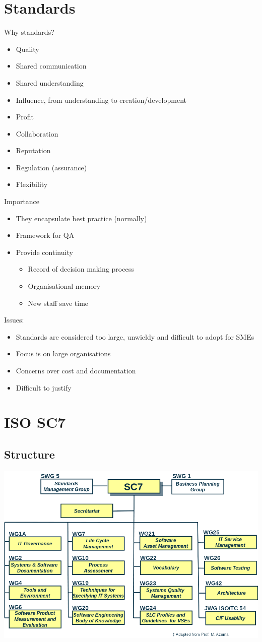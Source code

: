 \documentclass{article}[18pt]
\begin{document}
\section{Standards}
Why standards?
\begin{itemize}
	\item Quality
	\item Shared communication
	\item Shared understanding
	\item Influence, from understanding to creation/development
	\item Profit
	\item Collaboration
	\item Reputation
	\item Regulation (assurance)
	\item Flexibility
\end{itemize}
Importance
\begin{itemize}
	\item They encapsulate best practice (normally)
	\item Framework for QA
	\item Provide continuity
	\begin{itemize}
		\item Record of decision making process
		\item Organisational memory
		\item New staff save time
	\end{itemize}
\end{itemize}
Issues:
\begin{itemize}
	\item Standards are considered too large, unwieldy and difficult to adopt for SMEs
	\item Focus is on large organisations
	\item Concerns over cost and documentation
	\item Difficult to justify
\end{itemize}
\section{ISO SC7}
\subsection{Structure}
\begin{center}
	\includegraphics[scale=0.7]{SC7}
\end{center}
\end{document}
